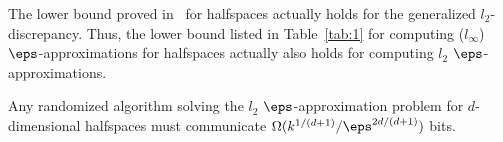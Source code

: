 The lower bound proved in~\cite{alexander1990geometric} for halfspaces actually holds for
the generalized $l_2$-discrepancy.  Thus, the lower bound listed in Table~\ref{tab:1} for
computing ($l_\infty$) $\eps$-approximations for halfspaces actually also holds for computing $l_2$
$\eps$-approximations.

 \begin{corollary}
 Any randomized algorithm solving the $l_2$ $\eps$-approximation problem for $d$-dimensional halfspaces must communicate $\Omega(k^{1/(d+1)}/\eps^{2d/(d+1)})$ bits.
 \end{corollary}

